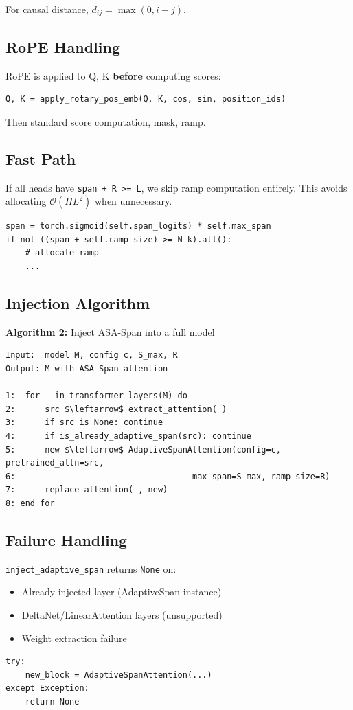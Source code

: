 For causal distance, $d_{ij} = \max(0, i - j)$.

\subsection{RoPE Handling}

RoPE is applied to Q, K \textbf{before} computing scores:

\begin{lstlisting}
Q, K = apply_rotary_pos_emb(Q, K, cos, sin, position_ids)
\end{lstlisting}

Then standard score computation, mask, ramp.

\subsection{Fast Path}

If all heads have \texttt{span + R >= L}, we skip ramp computation entirely. This 
avoids allocating $\mathcal{O}(H L^2)$ when unnecessary.

\begin{lstlisting}
span = torch.sigmoid(self.span_logits) * self.max_span
if not ((span + self.ramp_size) >= N_k).all():
    # allocate ramp
    ...
\end{lstlisting}

\subsection{Injection Algorithm}

\textbf{Algorithm 2:} Inject ASA-Span into a full model
\begin{lstlisting}
Input:  model M, config c, S_max, R
Output: M with ASA-Span attention

1:  for   in transformer_layers(M) do
2:      src $\leftarrow$ extract_attention( )
3:      if src is None: continue
4:      if is_already_adaptive_span(src): continue
5:      new $\leftarrow$ AdaptiveSpanAttention(config=c, pretrained_attn=src,
6:                                    max_span=S_max, ramp_size=R)
7:      replace_attention( , new)
8: end for
\end{lstlisting}

\subsection{Failure Handling}

\texttt{inject\_adaptive\_span} returns \texttt{None} on:
\begin{itemize}
\item Already-injected layer (AdaptiveSpan instance)
\item DeltaNet/LinearAttention layers (unsupported)
\item Weight extraction failure

\end{itemize}
\begin{lstlisting}
try:
    new_block = AdaptiveSpanAttention(...)
except Exception:
    return None
\end{lstlisting}

